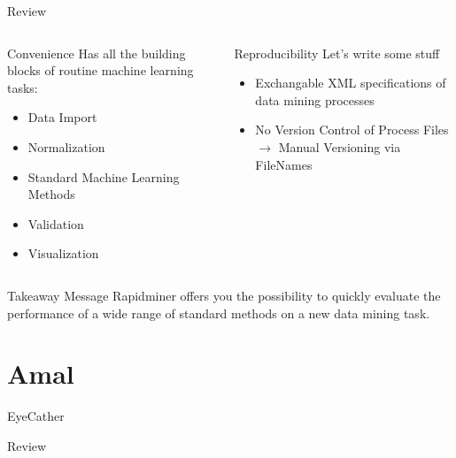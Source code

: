 \documentclass[aspectratio=169,10pt]{beamer}
\begin{document}
\begin{frame}[t,fragile]{Review}
    \begin{columns}[t]
    \begin{column}{0.5\textwidth}
    \begin{block}{Convenience}
        Has all the building blocks of routine machine learning tasks:
        \begin{itemize}
            \item Data Import
            \item Normalization
            \item Standard Machine Learning Methods
            \item Validation
            \item Visualization
        \end{itemize}
    \end{block}
    \end{column}
    \begin{column}{0.5\textwidth}
    \begin{block}{Reproducibility}
        Let's write some stuff
        \begin{itemize}
        \item Exchangable XML specifications of data mining processes
        \item No Version Control of Process Files $\rightarrow$ Manual Versioning via FileNames
        \end{itemize}
    \end{block}
    
    \end{column}
    \end{columns}
    \hfill
    
    \begin{alertblock}{Takeaway Message}
        Rapidminer offers you the possibility to quickly evaluate the performance of a wide range of standard methods on a new data mining task.
    \end{alertblock}
    
\end{frame}

\section{Amal}
\begin{frame}[fragile]{EyeCather}
\end{frame}
\begin{frame}[t,fragile]{Review}
\end{frame}
\end{document}
